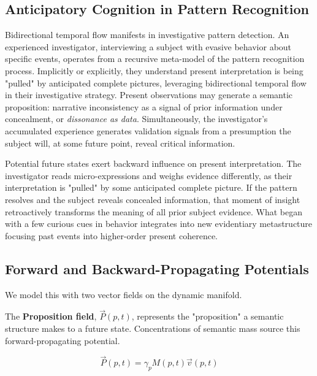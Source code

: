 \subsection{Anticipatory Cognition in Pattern Recognition}
\label{9.6.1:anticipatory_cognition_in_pattern_recognition}

Bidirectional temporal flow manifests in investigative pattern detection. An experienced investigator, interviewing a subject with evasive behavior about specific events, operates from a recursive meta-model of the pattern recognition process. Implicitly or explicitly, they understand present interpretation is being "pulled" by anticipated complete pictures, leveraging bidirectional temporal flow in their investigative strategy. Present observations may generate a semantic proposition: narrative inconsistency as a signal of prior information under concealment, or \textit{dissonance as data}. Simultaneously, the investigator's accumulated experience generates validation signals from a presumption the subject will, at some future point, reveal critical information.

Potential future states exert backward influence on present interpretation. The investigator reads micro-expressions and weighs evidence differently, as their interpretation is "pulled" by some anticipated complete picture. If the pattern resolves and the subject reveals concealed information, that moment of insight retroactively transforms the meaning of all prior subject evidence. What began with a few curious cues in behavior integrates into new evidentiary metastructure focusing past events into higher-order present coherence.


\subsection{Forward and Backward-Propagating Potentials}
\label{9.6.2:forward_and_backward_propagating_potentials}

We model this with two vector fields on the dynamic manifold.

The \textbf{Proposition field}, \(\vec{P}(p,t)\), represents the "proposition" a semantic structure makes to a future state. Concentrations of semantic mass source this forward-propagating potential.

\begin{equation}
\vec{P}(p,t) = \gamma_p M(p,t) \vec{v}(p,t)
\end{equation}

